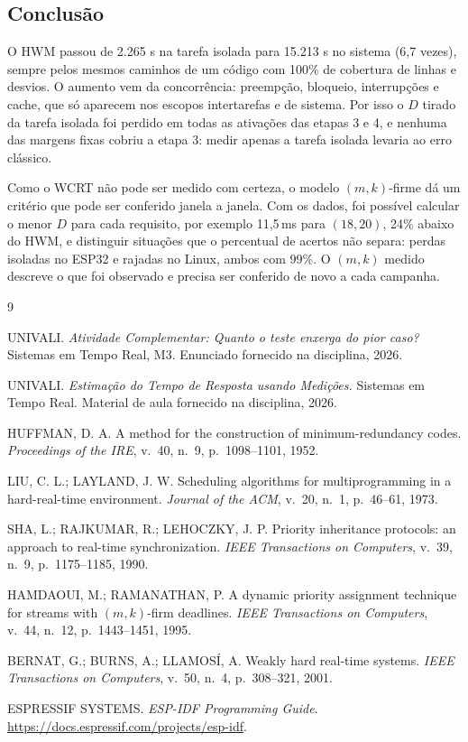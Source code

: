 \documentclass[11pt,a4paper]{article}
\newcommand{\us}{\ifmmode\,\mu\mathrm{s}\else\,\textmu s\fi}
\newcommand{\ms}{\,ms}
\begin{document}
\subsection{Conclusão}
O HWM passou de 2.265\us{} na tarefa isolada para 15.213\us{} no sistema (6,7
vezes), sempre pelos mesmos caminhos de um código com 100\% de cobertura de
linhas e desvios. O aumento vem da concorrência: preempção, bloqueio,
interrupções e cache, que só aparecem nos escopos intertarefas e de sistema.
Por isso o $D$ tirado da tarefa isolada foi perdido em todas as ativações das
etapas 3 e 4, e nenhuma das margens fixas cobriu a etapa 3: medir apenas a
tarefa isolada levaria ao erro clássico.

Como o WCRT não pode ser medido com certeza, o modelo $(m,k)$-firme dá um
critério que pode ser conferido janela a janela. Com os dados, foi possível
calcular o menor $D$ para cada requisito, por exemplo 11,5\ms{} para $(18,20)$,
24\% abaixo do HWM, e distinguir situações que o percentual de acertos não
separa: perdas isoladas no ESP32 e rajadas no Linux, ambos com 99\%. O
$(m,k)$ medido descreve o que foi observado e precisa ser conferido de novo a
cada campanha.

\renewcommand{\refname}{Referências}
\begin{thebibliography}{9}
\setlength{\itemsep}{0pt}
\footnotesize

 UNIVALI. \textit{Atividade Complementar: Quanto o teste
enxerga do pior caso?} Sistemas em Tempo Real, M3. Enunciado fornecido na
disciplina, 2026.

 UNIVALI. \textit{Estimação do Tempo de Resposta usando
Medições.} Sistemas em Tempo Real. Material de aula fornecido na disciplina,
2026.

 HUFFMAN, D. A. A method for the construction of
minimum-redundancy codes. \textit{Proceedings of the IRE}, v.~40, n.~9,
p.~1098--1101, 1952.

 LIU, C. L.; LAYLAND, J. W. Scheduling algorithms for
multiprogramming in a hard-real-time environment. \textit{Journal of the ACM},
v.~20, n.~1, p.~46--61, 1973.

 SHA, L.; RAJKUMAR, R.; LEHOCZKY, J. P. Priority inheritance
protocols: an approach to real-time synchronization. \textit{IEEE Transactions
on Computers}, v.~39, n.~9, p.~1175--1185, 1990.

 HAMDAOUI, M.; RAMANATHAN, P. A dynamic priority assignment
technique for streams with $(m,k)$-firm deadlines. \textit{IEEE Transactions on
Computers}, v.~44, n.~12, p.~1443--1451, 1995.

 BERNAT, G.; BURNS, A.; LLAMOSÍ, A. Weakly hard real-time
systems. \textit{IEEE Transactions on Computers}, v.~50, n.~4, p.~308--321,
2001.

 ESPRESSIF SYSTEMS. \textit{ESP-IDF Programming Guide}.
\url{https://docs.espressif.com/projects/esp-idf}.

\end{thebibliography}
\end{document}
